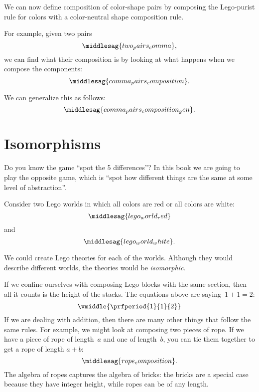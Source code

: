 We can now define composition of color-shape pairs by composing the Lego-purist rule for colors with a color-neutral shape composition rule.

For example, given two pairs
%
\begin{equation}
    \label{eq:two_pairs_comma}
    \middlesag{two_pairs_comma},
\end{equation}
%
we can find what their composition is by looking at what happens when we compose the components:
%
\begin{equation}
    \label{eq:comma_pairs_composition}
    \middlesag{comma_pairs_composition}.
\end{equation}

We can generalize this as follows:
\begin{equation}
    \label{eq:comma_pairs_composition_gen}
    \middlesag{comma_pairs_composition_gen}.
\end{equation}

\section{Isomorphisms}

Do you know the game ``spot the 5 differences''?
In this book we are going to play the opposite game, which is ``spot how different things are the same at some level of abstraction''.

Consider two Lego worlds in which all colors are red or all colors are white:
\begin{equation}
    \label{eq:lego_world_red}
    \middlesag{lego_world_red}
\end{equation}
%
and
%
\begin{equation}
    \label{eq:lego_world_white}
    \middlesag{lego_world_white}.
\end{equation}

We could create Lego theories for each of the worlds.
Although they would describe different worlds, the theories would be \emph{isomorphic}.

If we confine ourselves with composing Lego blocks with the same section, then all it counts is the height of the stacks.
The equations above are saying~$1+1=2$:
%
\begin{equation*}
    \vmiddle{\prfperiod{1}{1}{2}}
\end{equation*}
%
If we are dealing with addition, then there are many other things that follow the same rules.
For example, we might look at composing two pieces of rope.
If we have a piece of rope of length~$a$ and one of length~$b$, you can tie them together to get a rope of length $a+b$:
%
\begin{equation}
    \label{eq:rope-compose}
    \middlesag{rope_composition}.
\end{equation}
%
The algebra of ropes captures the algebra of bricks: the bricks are a special case because they have integer height, while ropes can be of any length.

